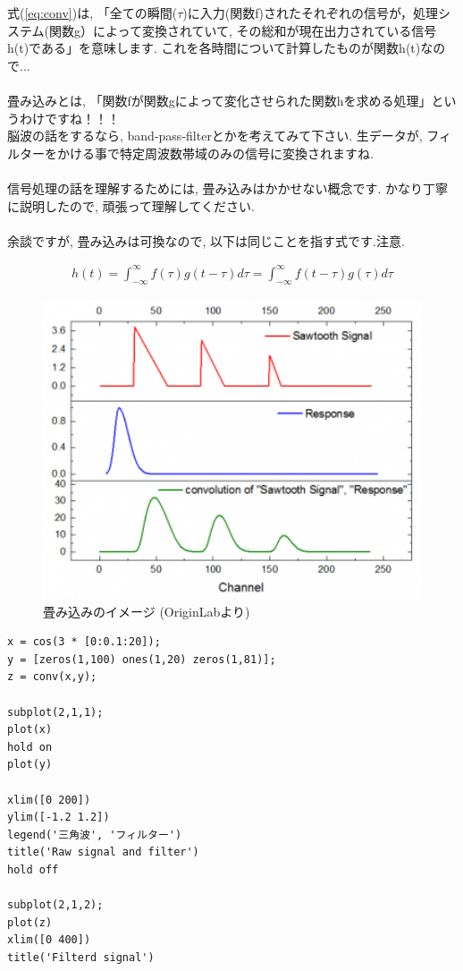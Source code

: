 \documentclass[11pt,a4paper]{jreport}
\begin{document}
式(\ref{eq:conv})は, 「全ての瞬間($\tau$)に入力(関数f)されたそれぞれの信号が，処理システム(関数g）によって変換されていて, その総和が現在出力されている信号h(t)である」を意味します. これを各時間について計算したものが関数h(t)なので...\\
\\
畳み込みとは, 「関数fが関数gによって変化させられた関数hを求める処理」というわけですね！！！\\
脳波の話をするなら, band-pass-filterとかを考えてみて下さい. 生データが, フィルターをかける事で特定周波数帯域のみの信号に変換されますね. \\
\\
信号処理の話を理解するためには, 畳み込みはかかせない概念です. かなり丁寧に説明したので, 頑張って理解してください.\\
\\
余談ですが, 畳み込みは可換なので, 以下は同じことを指す式です.注意.

\begin{eqnarray}
h(t) = \int^{\infty}_{-\infty} f(\tau) g(t - \tau) d\tau=
 \int^{\infty}_{-\infty} f(t-\tau) g(\tau) d\tau
\end{eqnarray}

\begin{figure}[H]
\label{im:convolution}
  \centering
  \includegraphics[width=120mm,bb=0 0 350 276]{../figures/Convolution.png}
  \caption{畳み込みのイメージ (OriginLabより)}
\end{figure}

\begin{lstlisting}[caption=畳み込みのコード,label=sc:conv]
x = cos(3 * [0:0.1:20]);
y = [zeros(1,100) ones(1,20) zeros(1,81)];
z = conv(x,y);

subplot(2,1,1);
plot(x)
hold on
plot(y)

xlim([0 200])
ylim([-1.2 1.2])
legend('三角波', 'フィルター')
title('Raw signal and filter')
hold off

subplot(2,1,2); 
plot(z)
xlim([0 400])
title('Filterd signal')
\end{lstlisting}
\end{document}
